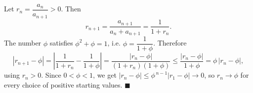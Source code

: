 Let $r_n=\dfrac{a_n}{a_{n+1}}>0$. Then
\[r_{n+1}=\dfrac{a_{n+1}}{a_n+a_{n+1}}=\dfrac{1}{1+r_n}.\]
The number $\phi$ satisfies $\phi^2+\phi=1$, i.e. $\phi=\dfrac{1}{1+\phi}$. Therefore
\[\left|r_{n+1}-\phi\right|=\left|\dfrac{1}{1+r_n}-\dfrac{1}{1+\phi}\right|=\dfrac{|r_n-\phi|}{(1+r_n)(1+\phi)}\le\dfrac{|r_n-\phi|}{1+\phi}=\phi\,|r_n-\phi|,\]
using $r_n>0$. Since $0<\phi<1$, we get $|r_n-\phi|\le\phi^{\,n-1}|r_1-\phi|\to0$, so $r_n\to\phi$ for every choice of positive starting values. $\blacksquare$
